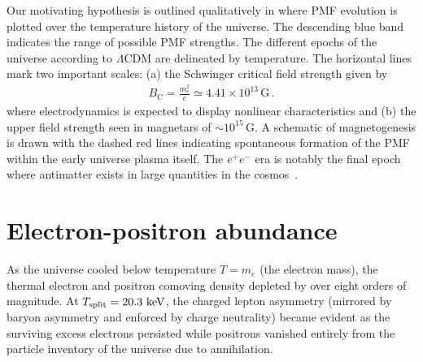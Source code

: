 Our motivating hypothesis is outlined qualitatively in  where PMF evolution is plotted over the temperature history of the universe. The descending blue band indicates the range of possible PMF strengths. The different epochs of the universe according to $\Lambda\mathrm{CDM}$ are delineated by temperature. The horizontal lines mark two important scales: (a) the Schwinger critical field strength given by
\begin{align}
    \label{crit:1}
    B_\mathrm{C} = \frac{m_{e}^{2}}{e}\simeq4.41\times10^{13}\,\mathrm{G}\,.
\end{align}
where electrodynamics is expected to display nonlinear characteristics and (b) the upper field strength seen in magnetars of $\sim10^{15}\,\mathrm{G}$. A schematic of magnetogenesis is drawn with the dashed red lines indicating spontaneous formation of the PMF within the early universe plasma itself. The $e^{+}e^{-}$ era is notably the final epoch where antimatter exists in large quantities in the cosmos~\citep{Rafelski:2023emw}.

\section{Electron-positron abundance}
\label{sec:abundance}
\noindent As the universe cooled below temperature $T\!=\!m_{e}$ (the electron mass), the thermal electron and positron comoving density depleted by over eight orders of magnitude. At $T_\mathrm{split}=20.3\text{ keV}$, the charged lepton asymmetry (mirrored by baryon asymmetry and enforced by charge neutrality) became evident as the surviving excess electrons persisted while positrons vanished entirely from the particle inventory of the universe due to annihilation.


